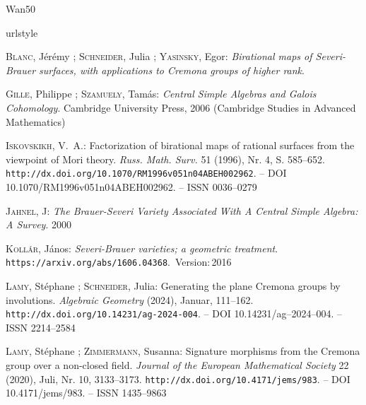 \documentclass[12pt, oneside, reqno]{amsart}
\begin{document}
\begin{thebibliography}{Wan50}


\providecommand{\url}[1]{\texttt{#1}}
\expandafter\ifx\csname urlstyle\endcsname\relax
  \providecommand{\doi}[1]{doi: #1}\else
  \providecommand{\doi}{doi: \begingroup \urlstyle{rm}\Url}\fi

\textsc{Blanc}, Jérémy ; \textsc{Schneider}, Julia  ; \textsc{Yasinsky}, Egor:
\newblock \emph{Birational maps of Severi-Brauer surfaces, with applications to Cremona groups of higher rank}.

\textsc{Gille}, Philippe ; \textsc{Szamuely}, Tamás:
\newblock \emph{Central Simple Algebras and Galois Cohomology}.
\newblock Cambridge University Press, 2006 (Cambridge Studies in Advanced Mathematics)

\textsc{Iskovskikh}, V.~A.:
\newblock Factorization of birational maps of rational surfaces from the viewpoint of {Mori} theory.
\emph{Russ. Math. Surv.} 51 (1996), Nr. 4, S. 585--652.
\newblock \url{http://dx.doi.org/10.1070/RM1996v051n04ABEH002962}. --
\newblock DOI 10.1070/RM1996v051n04ABEH002962. --
\newblock ISSN 0036--0279

\textsc{Jahnel}, J:
\newblock \emph{The Brauer-Severi Variety Associated With A Central Simple Algebra: A Survey}.
 2000

\textsc{Kollár}, János:
\newblock \emph{Severi-Brauer varieties; a geometric treatment}.
\newblock \url{https://arxiv.org/abs/1606.04368}.
\newblock \,Version:\,2016

\textsc{Lamy}, Stéphane ; \textsc{Schneider}, Julia:
\newblock Generating the plane Cremona groups by involutions.
\emph{Algebraic Geometry}  (2024), Januar, 111--162.
\newblock \url{http://dx.doi.org/10.14231/ag-2024-004}. --
\newblock DOI 10.14231/ag--2024--004. --
\newblock ISSN 2214--2584

\textsc{Lamy}, Stéphane ; \textsc{Zimmermann}, Susanna:
\newblock Signature morphisms from the Cremona group over a non-closed field.
\emph{Journal of the European Mathematical Society} 22 (2020), Juli, Nr. 10, 3133--3173.
\newblock \url{http://dx.doi.org/10.4171/jems/983}. --
\newblock DOI 10.4171/jems/983. --
\newblock ISSN 1435--9863


\end{thebibliography}
\end{document}
